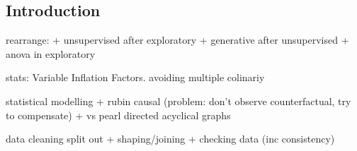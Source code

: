 
\subsection{Introduction}

rearrange:
+ unsupervised after exploratory
+ generative after unsupervised
+ anova in exploratory

stats: Variable Inflation Factors. avoiding multiple colinariy

statistical modelling
+ rubin causal (problem: don't observe counterfactual, try to compensate)
+ vs pearl directed acyclical graphs

data cleaning split out
+ shaping/joining
+ checking data (inc consistency)

